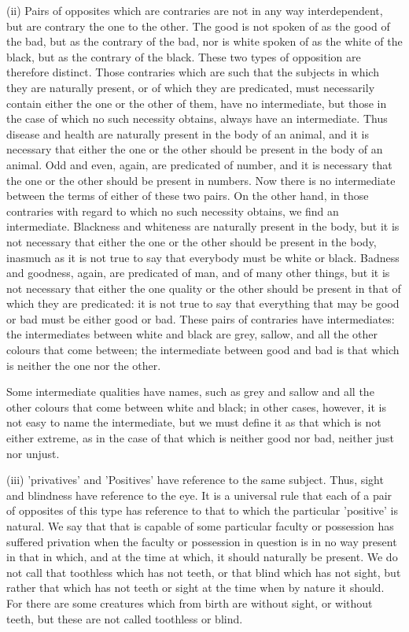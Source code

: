 (ii) Pairs of opposites which are contraries are not in any way
interdependent, but are contrary the one to the other. The good is not
spoken of as the good of the bad, but as the contrary of the bad, nor
is white spoken of as the white of the black, but as the contrary of
the black. These two types of opposition are therefore distinct. Those
contraries which are such that the subjects in which they are naturally
present, or of which they are predicated, must necessarily contain
either the one or the other of them, have no intermediate, but those in
the case of which no such necessity obtains, always have an
intermediate. Thus disease and health are naturally present in the body
of an animal, and it is necessary that either the one or the other
should be present in the body of an animal. Odd and even, again, are
predicated of number, and it is necessary that the one or the other
should be present in numbers. Now there is no intermediate between the
terms of either of these two pairs. On the other hand, in those
contraries with regard to which no such necessity obtains, we find an
intermediate. Blackness and whiteness are naturally present in the
body, but it is not necessary that either the one or the other should
be present in the body, inasmuch as it is not true to say that
everybody must be white or black. Badness and goodness, again, are
predicated of man, and of many other things, but it is not necessary
that either the one quality or the other should be present in that of
which they are predicated: it is not true to say that everything that
may be good or bad must be either good or bad. These pairs of
contraries have intermediates: the intermediates between white and
black are grey, sallow, and all the other colours that come between;
the intermediate between good and bad is that which is neither the one
nor the other.

Some intermediate qualities have names, such as grey and sallow and all
the other colours that come between white and black; in other cases,
however, it is not easy to name the intermediate, but we must define it
as that which is not either extreme, as in the case of that which is
neither good nor bad, neither just nor unjust.

(iii) 'privatives' and 'Positives' have reference to the same subject.
Thus, sight and blindness have reference to the eye. It is a universal
rule that each of a pair of opposites of this type has reference to
that to which the particular 'positive' is natural. We say that that is
capable of some particular faculty or possession has suffered privation
when the faculty or possession in question is in no way present in that
in which, and at the time at which, it should naturally be present. We
do not call that toothless which has not teeth, or that blind which has
not sight, but rather that which has not teeth or sight at the time
when by nature it should. For there are some creatures which from birth
are without sight, or without teeth, but these are not called toothless
or blind.

